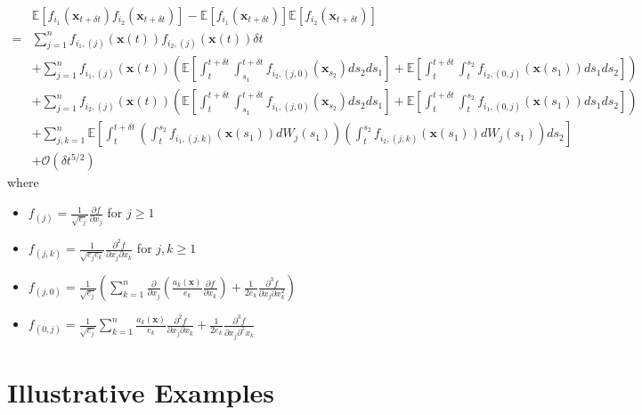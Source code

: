 \begin{equation} \label{eq:cov_est}
\begin{aligned}
&\mathbb{E} \left[ f_{i_1}(\mathbf{x}_{t + \delta t}) f_{i_2}(\mathbf{x}_{t + \delta t}) \right] 
- \mathbb{E} \left[ f_{i_1}(\mathbf{x}_{t + \delta t}) \right] \mathbb{E} \left[ f_{i_2}(\mathbf{x}_{t + \delta t}) \right] \\
=& 
 \sum_{j=1}^n f_{{i_1},(j)}(\mathbf{x}(t)) f_{{i_2},(j)}(\mathbf{x}(t)) \delta t \\
&+ \sum_{j=1}^n f_{{i_1},(j)}(\mathbf{x}(t)) \left( \mathbb{E} \left[ \int_t^{t+\delta t} \int_{s_1}^{t+\delta t} f_{{i_2},(j,0)}(\mathbf{x}_{s_2}) ds_2 ds_1 \right] 
+ \mathbb{E} \left[  \int_t^{t+\delta t} \int_t^{s_2} f_{{i_2},(0,j)}(\mathbf{x}(s_1)) ds_1 ds_2\right] \right) \\
&+  \sum_{j=1}^n f_{{i_2},(j)}(\mathbf{x}(t)) \left( \mathbb{E} \left[ \int_t^{t+\delta t} \int_{s_1}^{t + \delta t} f_{{i_1},(j,0)}(\mathbf{x}_{s_2}) ds_2 ds_1 \right]
+ \mathbb{E} \left[ \int_t^{t+\delta t} \int_t^{s_2} f_{{i_1},(0,j)}(\mathbf{x}(s_1)) ds_1 ds_2 \right] \right) \\
&+ \sum_{j, k=1}^n \mathbb{E} \left[ \int_t^{t+\delta t}\left( \int_t^{s_2} f_{{i_1},(j,k)}(\mathbf{x}(s_1)) dW_j(s_1)  \right) \left(  \int_t^{s_2} f_{{i_2},(j,k)}(\mathbf{x}(s_1)) dW_j(s_1) \right) ds_2 \right] \\
&+ \mathcal{O} (\delta t^{5/2})
\end{aligned}
\end{equation}
%
where
\begin{itemize}
\item $f_{(j)} = \frac{1}{\sqrt{e_j}} \frac{\partial f}{\partial x_j}$ for $j \ge 1$
\item $f_{(j, k)} = \frac{1}{\sqrt{e_j e_k}} \frac{\partial^2 f}{\partial x_j \partial x_k}$ for $j,k \ge 1$
\item $f_{(j,0)} = \frac{1}{\sqrt{e_j}} \left( \sum_{k=1}^n \frac{\partial}{\partial x_j} \left( \frac{a_k(\mathbf{x})}{e_k} \frac{\partial f}{\partial x_k} \right) + \frac{1}{2 e_k} \frac{\partial^3 f}{\partial x_j \partial x_k^2} \right)$
\item $f_{(0, j)} = \frac{1}{\sqrt{e_j}} \sum_{k=1}^n \frac{a_k(\mathbf{x})}{e_k} \frac{\partial^2 f}{\partial x_j \partial x_k} +\frac{1}{2 e_k}  \frac{\partial^3 f}{\partial x_j \partial^2 x_k}$
\end{itemize}

\section{Illustrative Examples}

